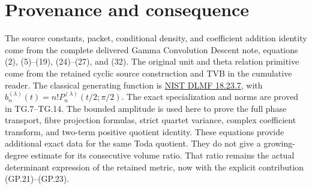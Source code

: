 \documentclass[11pt]{article}
\begin{document}
\section{Provenance and consequence}
The source constants, packet, conditional density, and coefficient
addition identity come from the complete delivered Gamma Convolution
Descent note, equations (2), (5)--(19), (24)--(27), and (32).
The original unit and theta relation primitive come from the retained
cyclic source construction and TVB in the cumulative reader. The
classical generating function is
\href{https://dlmf.nist.gov/18.23.E7}{NIST DLMF 18.23.7}, with
$b_n^{(\lambda)}(t)=n!P_n^{(\lambda)}(t/2;\pi/2)$.
The exact specialization and norms are proved in TG.7--TG.14.
The bounded amplitude is used here to prove the full phase transport,
fibre projection formulas, strict quartet variance, complex coefficient
transform, and two-term positive quotient identity. These equations
provide additional exact data for the same Toda quotient. They do not
give a growing-degree estimate for its consecutive volume ratio.
That ratio remains the actual determinant expression of the retained
metric, now with the explicit contribution (GP.21)--(GP.23).
\end{document}
